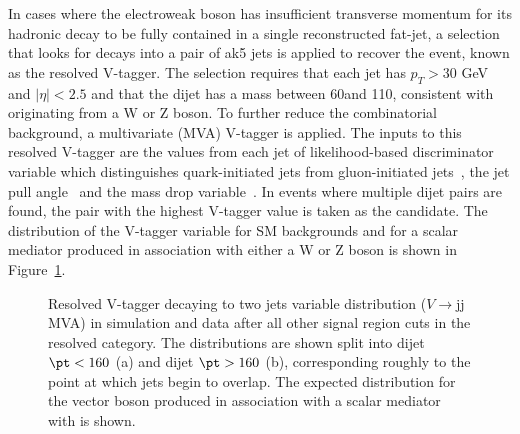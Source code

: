 In cases where the electroweak boson has insufficient transverse momentum for its hadronic
decay to be fully contained in a single reconstructed fat-jet, a selection that looks for decays 
into a pair of ak5 jets is applied to recover the event, known as the resolved V-tagger. 
The selection requires that each jet has $p_T>30$ GeV and $|\eta|<2.5$ and that the dijet has a mass between 60\gev and 110\gev, consistent with originating 
from a W or Z boson. To further reduce the combinatorial background, a
multivariate (MVA)  V-tagger is applied. The inputs to this resolved V-tagger are the values from each jet of likelihood-based discriminator variable 
which distinguishes quark-initiated jets from gluon-initiated
jets~\cite{JME-14-002}, the jet pull angle~\cite{Gallicchio:2010sw}
and the mass drop variable~\cite{Izaguirre:2014ira}. In events 
where multiple dijet pairs are found, the pair with the highest V-tagger value is taken as the candidate. The distribution of the V-tagger variable for SM backgrounds and for a scalar mediator
produced in association with either a W or Z boson is shown in Figure~\ref{fig:vtagger}.
\begin{figure}[hbtp]\begin{center}
 \caption{
Resolved V-tagger decaying to two jets variable distribution
($V\rightarrow$jj  MVA) in simulation and data after all other
signal region cuts in the resolved category. 
The distributions are shown split into dijet $\pt < 160$ \gev (a) and dijet
$\pt > 160$ \gev (b), corresponding roughly to the point at which jets begin to overlap. 
The expected distribution for the vector boson produced in association with a scalar mediator with is shown.} 
 \label{fig:vtagger}\end{center}\end{figure}

